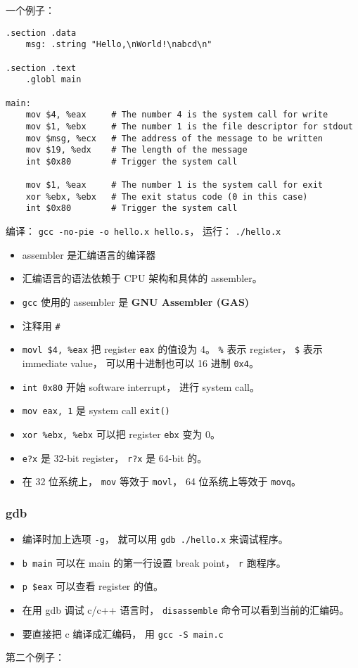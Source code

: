 
\begin{issues}
\issueDraft
\end{issues}

一个例子：
\begin{lstlisting}[language=none]
.section .data
    msg: .string "Hello,\nWorld!\nabcd\n"

.section .text
    .globl main

main:
    mov $4, %eax     # The number 4 is the system call for write
    mov $1, %ebx     # The number 1 is the file descriptor for stdout
    mov $msg, %ecx   # The address of the message to be written
    mov $19, %edx    # The length of the message
    int $0x80        # Trigger the system call

    mov $1, %eax     # The number 1 is the system call for exit
    xor %ebx, %ebx   # The exit status code (0 in this case)
    int $0x80        # Trigger the system call
\end{lstlisting}

编译： \verb|gcc -no-pie -o hello.x hello.s|， 运行： \verb|./hello.x|

\begin{itemize}
\item assembler 是汇编语言的编译器
\item 汇编语言的语法依赖于 CPU 架构和具体的 assembler。
\item \verb|gcc| 使用的 assembler 是 \textbf{GNU Assembler (GAS)}
\item 注释用 \verb|#|
\item \verb|movl $4, %eax| 把 register \verb|eax| 的值设为 4。 \verb|%| 表示 register， \verb|$| 表示 immediate value， 可以用十进制也可以 16 进制 \verb|0x4|。
\item \verb|int 0x80| 开始 software interrupt， 进行 system call。
\item \verb|mov eax, 1| 是 system call \verb|exit()|
\item \verb|xor %ebx, %ebx| 可以把 register \verb|ebx| 变为 0。
\item \verb|e?x| 是 32-bit register， \verb|r?x| 是 64-bit 的。
\item 在 32 位系统上， \verb|mov| 等效于 \verb|movl|， 64 位系统上等效于 \verb|movq|。
\end{itemize}

\subsubsection{gdb}
\begin{itemize}
\item 编译时加上选项 \verb|-g|， 就可以用 \verb|gdb ./hello.x| 来调试程序。
\item \verb|b main| 可以在 main 的第一行设置 break point， \verb|r| 跑程序。
\item \verb|p $eax| 可以查看 register 的值。
\item 在用 gdb 调试 c/c++ 语言时， \verb|disassemble| 命令可以看到当前的汇编码。
\item 要直接把 c 编译成汇编码， 用 \verb|gcc -S main.c|
\end{itemize}


第二个例子：

